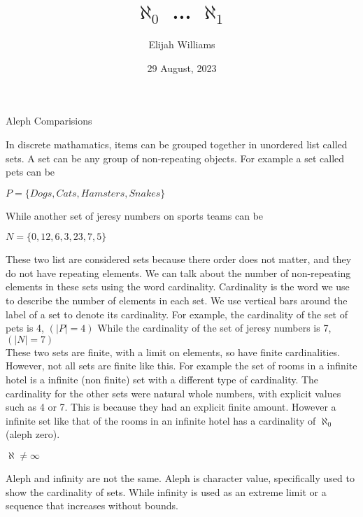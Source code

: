 \documentclass{article}
\title{$\aleph_0$   ...  $\aleph_1$}
\author{Elijah Williams}
\date{29 August, 2023}
\begin{document}
\maketitle
\newpage
\begin{large}
\begin{center}
  {\Huge Aleph Comparisions}
\end{center}





In discrete mathamatics, items can be grouped together in unordered list called sets.
A set can be any group of non-repeating objects.
For example a set called pets can be
\begin{center}
$ P = \{Dogs, Cats, Hamsters, Snakes\}$ 
\end{center}
While another set of jeresy numbers on sports teams can be
\begin{center}
$ N = \{0, 12, 6, 3, 23, 7, 5\}$

\end{center}
These two list are considered sets because there order does not matter, and they do not have repeating elements.
We can talk about the number of non-repeating elements in these sets using the word cardinality.
Cardinality is the word we use to describe the number of elements in each set.
We use vertical bars around the label of a set to denote its cardinality.
For example, the cardinality of the set of pets is 4, $ (|P| = 4)$
While the cardinality of the set of jeresy numbers is 7, $ (|N| = 7)$
\\


     These two sets are finite, with a limit on elements, so have finite cardinalities.
However, not all sets are finite like this.
For example the set of rooms in a infinite hotel is a infinite (non finite) set with a different type of cardinality.
The cardinality for the other sets were natural whole numbers, with explicit values such as 4 or 7.
This is because they had an explicit finite amount.
However a infinite set like that of the rooms in an infinite hotel has a cardinality of $ \aleph_0 $ (aleph zero).
\\


\begin{center}
$ \aleph \neq \infty $
\end{center}
Aleph and infinity are not the same.
Aleph is character value, specifically used to show the cardinality of sets.
While infinity is used as an extreme limit or a sequence that increases without bounds.
\\


\end{large}
\end{document}
